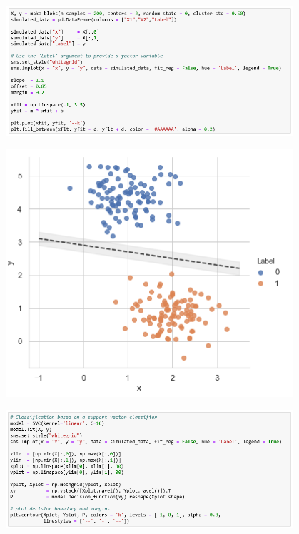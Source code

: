 \documentclass[9pt]{beamer}
\begin{document}
\begin{frame}
\begin{center}
\includegraphics[width=0.8\textwidth]{svm_data1.png}
\end{center}
\end{frame}

\begin{frame}
\begin{center}
\includegraphics[width=0.8\textwidth]{svm_data2.png}
\end{center}
\end{frame}

\begin{frame}
\begin{center}
\includegraphics[width=0.8\textwidth]{svm_linear1.png}
\end{center}
\end{frame}
\end{document}
